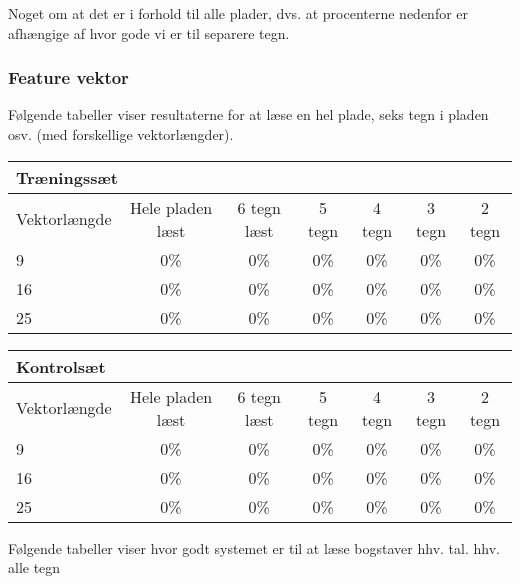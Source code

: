 Noget om at det er i forhold til alle plader, dvs. at procenterne nedenfor er afhængige af hvor gode vi er til separere tegn.

\subsubsection{Feature vektor}


Følgende tabeller viser resultaterne for at læse en hel plade, seks tegn i pladen osv. (med forskellige vektorlængder).

\begin{tabular}{|l|c|c|c|c|c|c|}\hline
\multicolumn{7}{|l|}{Træningssæt} \\\hline
Vektorlængde & Hele pladen læst & 6 tegn læst & 5 tegn & 4 tegn & 3 tegn & 2 tegn \\\hline
9 & 0\% & 0\% & 0\% & 0\% & 0\% & 0\% \\\hline
16 & 0\% & 0\% & 0\% & 0\% & 0\% & 0\% \\\hline
25 & 0\% & 0\% & 0\% & 0\% & 0\% & 0\% \\\hline \end{tabular}

\begin{tabular}{|l|c|c|c|c|c|c|}\hline
\multicolumn{7}{|l|}{Kontrolsæt} \\\hline
Vektorlængde & Hele pladen læst & 6 tegn læst & 5 tegn & 4 tegn & 3 tegn & 2 tegn \\\hline
9 & 0\% & 0\% & 0\% & 0\% & 0\% & 0\% \\\hline
16 & 0\% & 0\% & 0\% & 0\% & 0\% & 0\% \\\hline
25 & 0\% & 0\% & 0\% & 0\% & 0\% & 0\% \\\hline \end{tabular}


Følgende tabeller viser hvor godt systemet er til at læse bogstaver hhv. tal. hhv. alle tegn


